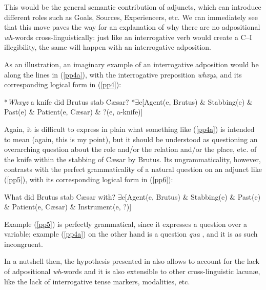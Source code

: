 \documentclass[output=paper]{langsci/langscibook}
\begin{document}
This would be the general semantic contribution of adjuncts, which can
introduce different roles such as Goals, Sources, Experiencers, etc.
We can immediately see that this move paves the way for an explanation of why
there are no adpositional \emph{wh}-words cross-linguistically:
just like an interrogative verb would create a C--I illegibility, the same will happen with an interrogative adposition.

As an illustration, an imaginary example of an interrogative adposition would
be along the lines in (\ref{pp4a}), with the interrogative preposition
\emph{whxyz}, and its corresponding logical form in (\ref{pp4}):\newpage

\begin{exe}
    \ex\label{ex:15.48}
\begin{xlista}
\ex \label{pp4a} *\emph{Whxyz} a knife did Brutus stab C\ae{}sar?
\ex \label{pp4} *$\exists$e[Agent(e, Brutus) \& Stabbing(e) \& Past(e) \& Patient(e, C\ae{}sar) \& ?(e, a-knife)]
\end{xlista}
\end{exe}

Again, it is difficult to express in plain  what something like
(\ref{pp4a}) is intended to mean (again, this is my point), but it should be
understood as questioning an overarching question about the role and/or the
relation and/or the place, etc. of the knife within the stabbing of C\ae{}sar
by Brutus. Its ungrammaticality, however, contrasts with the perfect
grammaticality of a natural question on an adjunct like (\ref{pp5}), with its
corresponding logical form in (\ref{pp6}):

\begin{exe}
\ex
\begin{xlista}
\ex \label{pp5} What did Brutus stab C\ae{}sar with?
\ex \label{pp6} $\exists$e[Agent(e, Brutus) \& Stabbing(e) \& Past(e) \& Patient(e, C\ae{}sar) \& Instrument(e, ?)]
\end{xlista}
\end{exe}

Example (\ref{pp5}) is perfectly grammatical, since it expresses a question
over a variable; example (\ref{pp4a}) on the other hand is a question
\emph{qua} , and it is as such incongruent.

In a nutshell then, the hypothesis presented in  also allows to
account for the lack of adpositional \emph{wh}-words and it is also
extensible to other cross-linguistic lacun\ae, like the lack of interrogative
tense markers, modalities, etc.
\end{document}
